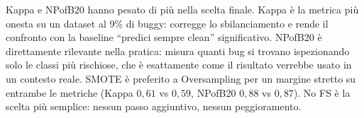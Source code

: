 Kappa e NPofB20 hanno pesato di più nella scelta finale. Kappa è la metrica più onesta su
un dataset al 9\% di buggy: corregge lo sbilanciamento e rende il confronto con la baseline
``predici sempre clean'' significativo. NPofB20 è direttamente rilevante nella pratica: misura
quanti bug si trovano ispezionando solo le classi più rischiose, che è esattamente come il
risultato verrebbe usato in un contesto reale. SMOTE è preferito a Oversampling per un margine
stretto su entrambe le metriche (Kappa $0{,}61$ vs $0{,}59$, NPofB20 $0{,}88$ vs $0{,}87$).
No FS è la scelta più semplice: nessun passo aggiuntivo, nessun peggioramento.
